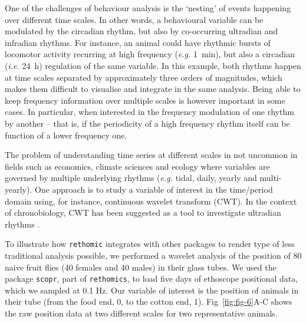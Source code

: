 \documentclass[10pt,letterpaper]{article}\usepackage[]{graphicx}\usepackage[]{color}
\begin{document}
One of the challenges of behaviour analysis is the `nesting' of events happening over different time scales.
In other words, a behavioural variable can be modulated by the circadian rhythm, but also by co-occurring ultradian and infradian rhythms.
For instance, an animal could have rhythmic bursts of locomotor activity recurring at high frequency (\emph{e.g.} 1~min), but also a circadian  (\emph{i.e.} 24~h) regulation of the same variable.
In this example, both rhythms happen at time scales separated by approximately three orders of magnitudes, which makes them difficult to visualise and integrate in the same analysis.
Being able to keep frequency information over multiple scales is however important in some cases.
In particular, when interested in the frequency modulation of one rhythm by another --
that is, if the periodicity of a high frequency rhythm itself can be function of a lower frequency one.

The problem of understanding time series at different scales in not uncommon in fields such as economics\cite{aguiar-conraria_business_2011}, climate sciences\cite{lau_climate_1995} and ecology\cite{cazelles_wavelet_2008} where variables are governed by multiple underlying rhythms (\emph{e.g.} tidal, daily, yearly and multi-yearly).
One approach is to study a variable of interest in the time/period domain using, for instance, continuous wavelet transform (CWT)\cite{grossmann_decomposition_1984}.
In the context of chronobiology, CWT has been suggested as a tool to investigate ultradian rhythms \cite{leise_wavelet_2013}.

To illustrate how \texttt{rethomic} integrates with other packages to render type of less traditional analysis possible,
we performed a wavelet analysis of the position of 80 naive fruit flies (40 females and 40 males) in their glass tubes.
We used the package \texttt{scopr}, part of \texttt{rethomics}, to load five days of ethoscope positional data, which we sampled at 0.1 Hz.
Our variable of interest is the position of animals in their tube (from the food end, 0,  to the cotton end, 1).
Fig~\ref{fig:fig-6}A-C shows the raw position data at two different scales for two representative animals.
\end{document}
